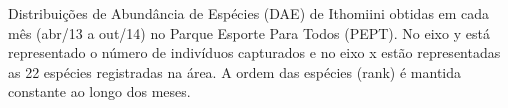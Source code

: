 \label{fig:2.1.4} Distribuições de Abundância de Espécies (DAE) de Ithomiini obtidas em cada mês (abr/13 a out/14) no Parque Esporte Para Todos (PEPT). No eixo y está representado o número de indivíduos capturados e no eixo x estão representadas as 22 espécies registradas na área. A ordem das espécies (rank) é mantida constante ao longo dos meses. 


